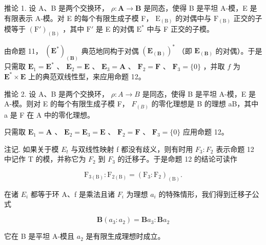 推论 1. 设 A、B 是两个交换环， \(\rho: \mathbf{A} \to \mathbf{B}\) 是同态，使得 B 是平坦 A-模，E 是有限表示 A-模。对 E 的每个有限生成子模 F， \(\mathrm{E}_{(\mathrm{B})}\) 的对偶中与 \(\mathrm{F}_{(\mathrm{B})}\) 正交的子模等于 \((\mathrm{F}')_{(\mathrm{B})}\) ，其中 \(\mathrm{F}'\) 是 E 的对偶 \(\mathrm{E}^*\) 中与 F 正交的子模。

由命题 11， \((\mathbf{E}^{*})_{(\mathbf{B})}\) 典范地同构于对偶 \((\mathbf{E}_{(\mathbf{B})})^{*}\) （即 \(\mathbf{E}_{(\mathbf{B})}\) 的对偶）。于是只需取 \(\mathbf{E}_1 = \mathbf{E}^*\) 、 \(\mathbf{E}_2 = \mathbf{E}\) 、 \(\mathbf{E}_3 = \mathbf{A}\) 、 \(\mathbf{F}_2 = \mathbf{F}\) 、 \(\mathbf{F}_3 = \{0\}\) ，并取 \(f\) 为 \(\mathbf{E}^{*} \times \mathbf{E}\) 上的典范双线性型，来应用命题 12。

推论 2. 设 A、B 是两个交换环， \(\rho: A \to B\) 是同态，使得 B 是平坦 A-模，E 是 A-模。则对 E 的每个有限生成子模 F， \(F_{(B)}\) 的零化理想是 B 的理想 aB，其中 a 是 F 在 A 中的零化理想。

只需取 \(\mathbf{E}_1 = \mathbf{A}\) 、 \(\mathbf{E}_2 = \mathbf{E}_3 = \mathbf{E}\) 、 \(\mathbf{F}_2 = \mathbf{F}\) 、 \(\mathbf{F}_3 = \{0\}\) 应用命题 12。

注记. 如果关于模 \(E_{t}\) 与双线性映射 f 都没有歧义，则有时用 \(F_{3}: F_{2}\) 表示命题 12 中记作 T 的模，并称它为 \(F_{2}\) 到 \(F_{3}\) 的迁移子。于是命题 12 的结论可读作

\[
\mathrm{F} _ {3 (\mathrm{B})}: \mathrm{F} _ {2 (\mathrm{B})} = \left(\mathrm{F} _ {3}: \mathrm{F} _ {2}\right) _ {(\mathrm{B})}.\tag{11}
\]

在诸 \(E_{i}\) 都等于环 A、f 是乘法且诸 \(F_{i}\) 为理想 \(a_{i}\) 的特殊情形，我们得到迁移子公式

\[
\mathbf {B} \left(a _ {3}: a _ {2}\right) = \mathbf {B} a _ {3}: \mathbf {B} a _ {2}\tag{12}
\]

它在 B 是平坦 A-模且 \(a_{2}\) 是有限生成理想时成立。
